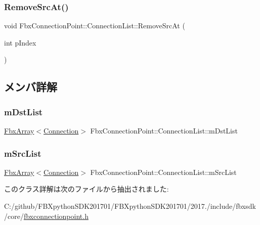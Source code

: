 \subsubsection{\texorpdfstring{Remove\+Src\+At()}{RemoveSrcAt()}}
{\footnotesize\ttfamily void Fbx\+Connection\+Point\+::\+Connection\+List\+::\+Remove\+Src\+At (\begin{DoxyParamCaption}\item[{int}]{p\+Index }\end{DoxyParamCaption})}



\subsection{メンバ詳解}
\mbox{\label{class_fbx_connection_point_1_1_connection_list_a8ac3c6f72ba91b17f651159a87670db3}} 
\subsubsection{\texorpdfstring{m\+Dst\+List}{mDstList}}
{\footnotesize\ttfamily \hyperlink{class_fbx_array}{Fbx\+Array}$<$\hyperlink{struct_fbx_connection_point_1_1_connection_list_1_1_connection}{Connection}$>$ Fbx\+Connection\+Point\+::\+Connection\+List\+::m\+Dst\+List\hspace{0.3cm}{\ttfamily [protected]}}

\mbox{\label{class_fbx_connection_point_1_1_connection_list_a9eb70c4ab758d092ca447956c37d1d20}} 
\subsubsection{\texorpdfstring{m\+Src\+List}{mSrcList}}
{\footnotesize\ttfamily \hyperlink{class_fbx_array}{Fbx\+Array}$<$\hyperlink{struct_fbx_connection_point_1_1_connection_list_1_1_connection}{Connection}$>$ Fbx\+Connection\+Point\+::\+Connection\+List\+::m\+Src\+List\hspace{0.3cm}{\ttfamily [protected]}}



このクラス詳解は次のファイルから抽出されました\+:\begin{DoxyCompactItemize}
\item 
C\+:/github/\+F\+B\+Xpython\+S\+D\+K201701/\+F\+B\+Xpython\+S\+D\+K201701/2017./include/fbxsdk/core/\hyperlink{fbxconnectionpoint_8h}{fbxconnectionpoint.\+h}\end{DoxyCompactItemize}
